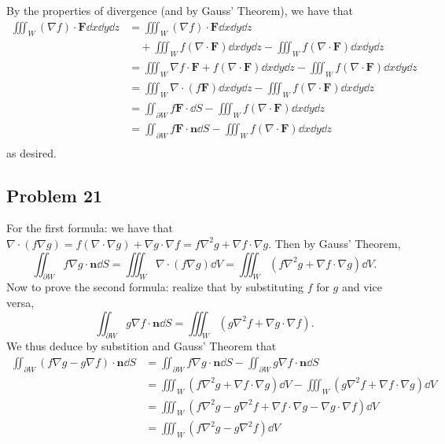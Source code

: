\documentclass[11pt]{article}
\renewcommand{\vec}[1]{\mathbf{#1}}
\renewcommand{\div}{\nabla \cdot}
\renewcommand{\grad}{\nabla}
\renewcommand{\laplacian}{\nabla^{2}}
\begin{document}
By the properties of divergence (and by Gauss' Theorem), we have that
\begin{align*}
	\iiint_{W} (\grad f) \cdot \mathbf{F} \dd{x} \dd{y} \dd{z} &= \iiint_{W} (\grad f) \cdot \mathbf{F} \dd{x} \dd{y} \dd{z} \\
	& \quad + \iiint_{W} f (\div \mathbf{F}) \dd{x} \dd{y} \dd{z} - \iiint_{W} f (\div \mathbf{F}) \dd{x} \dd{y} \dd{z} \\
	&= \iiint_{W} \grad f \cdot \mathbf{F} + f (\div \mathbf{F}) \dd{x} \dd{y} \dd{z} - \iiint_{W} f (\div \mathbf{F}) \dd{x} \dd{y} \dd{z} \\
	&= \iiint_{W} \div (f \mathbf{F}) \dd{x} \dd{y} \dd{z} - \iiint_{W} f (\div \mathbf{F}) \dd{x} \dd{y} \dd{z} \\
	&= \iint_{\partial W} f \mathbf{F} \cdot \dd{S} - \iiint_{W} f(\div \mathbf{F}) \dd{x} \dd{y} \dd{z} \\
	&= \iint_{\partial W} f \mathbf{F} \cdot \vec{n} \dd{S} - \iiint_{W} f(\div \mathbf{F}) \dd{x} \dd{y} \dd{z} \\
\end{align*}
as desired.


\subsection*{Problem 21}

For the first formula: we have that $\div (f \grad g) = f(\div \grad g) + \grad g \cdot \grad f = f \laplacian g + \grad f \cdot \grad g$. Then by Gauss' Theorem,
\[
	\iint_{\partial W} f \grad g \cdot \vec{n} \dd{S} = \iiint_{W} \div (f \grad g) \dd{V} = \iiint_{W} (f \laplacian g + \grad f \cdot \grad g) \dd{V}.
\]
Now to prove the second formula: realize that by substituting $f$ for $g$ and vice versa, 
\[
	\iint_{\partial W} g \grad f \cdot \vec{n} \dd{S} = \iiint_{W} (g \laplacian f + \grad g \cdot \grad f).
\]
We thus deduce by substition and Gauss' Theorem that
\begin{align*}
	\iint_{\partial W} (f \grad g - g \grad f) \cdot \vec{n} \dd{S} &= \iint_{\partial W} f \grad g \cdot \vec{n} \dd{S} - \iint_{\partial W} g \grad f \cdot \vec{n} \dd{S} \\
	&= \iiint_{W} (f \laplacian g + \grad f \cdot \grad g) \dd{V} - \iiint_{W} (g \laplacian f + \grad f \cdot \grad g) \dd{V} \\
	&= \iiint_{W} (f \laplacian g - g \laplacian f + \grad f \cdot \grad g - \grad g \cdot \grad f) \dd{V} \\
	&= \iiint_{W} (f \laplacian g - g \laplacian f) \dd{V} 
\end{align*}
\end{document}
